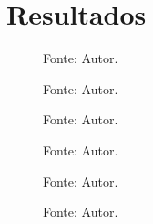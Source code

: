 \chapter{Resultados}



\begin{figure}[H]
    \centering
    \caption{\lstinline|simul_POLY_3_R_50|}
    
    \caption*{Fonte: Autor.}
\end{figure}

\begin{figure}[H]
    \centering
    \caption{\lstinline|simul_POLY_3_R_50_SNR_1_ATT|}
    
    \caption*{Fonte: Autor.}
\end{figure}

\begin{figure}[H]
    \centering
    \caption{\lstinline|simul_POLY_3_R_50_SNR_1|}
    
    \caption*{Fonte: Autor.}
\end{figure}



\begin{figure}[H]
    \centering
    \caption{\lstinline|simul_POLY_5_R_50|}
    
    \caption*{Fonte: Autor.}
\end{figure}


\begin{figure}[H]
    \centering
    \caption{\lstinline|simul_POLY_5_R_50_SNR_1|}
    
    \caption*{Fonte: Autor.}
\end{figure}


\begin{figure}[H]
    \centering
    \caption{\lstinline|simul_POLY_5_R_50_SNR_1_ATT|}
    
    \caption*{Fonte: Autor.}
\end{figure}
